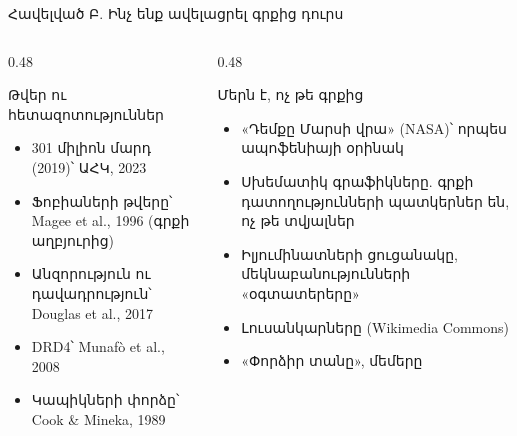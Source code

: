 \begin{frame}{Հավելված Բ. Ինչ ենք ավելացրել գրքից դուրս}
  \begin{columns}[T]
    \begin{column}{0.48\textwidth}
      \begin{card}[colback=mint!30!cardwhite, fontupper=\scriptsize]
        {\blackfont Թվեր ու հետազոտություններ}\par\smallskip
        \begin{itemize}\setlength{\itemsep}{0.5mm}
          \item 301 միլիոն մարդ (2019)՝ ԱՀԿ, 2023
          \item Ֆոբիաների թվերը՝ Magee et al., 1996 (գրքի աղբյուրից)
          \item Անզորություն ու դավադրություն՝ Douglas et al., 2017
          \item DRD4՝ Munafò et al., 2008
          \item Կապիկների փորձը՝ Cook \& Mineka, 1989
        \end{itemize}
      \end{card}
    \end{column}
    \begin{column}{0.48\textwidth}
      \begin{card}[colback=peach!35!cardwhite, fontupper=\scriptsize]
        {\blackfont Մերն է, ոչ թե գրքից}\par\smallskip
        \begin{itemize}\setlength{\itemsep}{0.5mm}
          \item «Դեմքը Մարսի վրա» (NASA)՝ որպես ապոֆենիայի օրինակ
          \item Սխեմատիկ գրաֆիկները. գրքի դատողությունների պատկերներ են, ոչ թե տվյալներ
          \item Իլյումինատների ցուցանակը, մեկնաբանությունների «օգտատերերը»
          \item Լուսանկարները (Wikimedia Commons)
          \item «Փորձիր տանը», մեմերը
        \end{itemize}
      \end{card}
    \end{column}
  \end{columns}
\end{frame}


